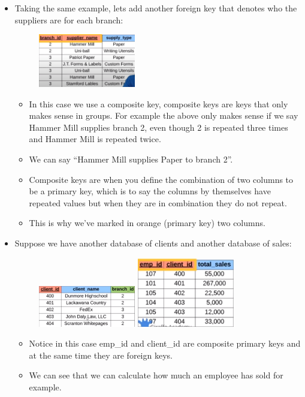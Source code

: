 \begin{itemize}
    \item Taking the same example, lets add another foreign key that denotes who the suppliers are for each branch:
        \begin{figure}[H]
            \centering
            \includegraphics[width=0.4\textwidth]{./figs/example6.png}
        \end{figure}
        \begin{itemize}
            \item In this case we use a composite key, composite keys are keys that only makes sense in groups. For example the above only makes sense if we say Hammer Mill supplies branch 2, even though 2 is repeated three times and Hammer Mill is repeated twice.
            \item We can say ``Hammer Mill supplies Paper to branch 2''.
            \item Composite keys are when you define the combination of two columns to be a primary key, which is to say the columns by themselves have repeated values but when they are in combination they do not repeat.
            \item This is why we've marked in orange (primary key) two columns.
        \end{itemize}
    
    \item Suppose we have another database of clients and another database of sales:
        \begin{figure}[H]
            \centering
            \includegraphics[width=0.4\textwidth]{./figs/example7.png}
            \includegraphics[width=0.4\textwidth]{./figs/example8.png}
        \end{figure}
        \begin{itemize}
            \item Notice in this case emp\_id and client\_id are composite primary keys and at the same time they are foreign keys.
            \item We can see that we can calculate how much an employee has sold for example.
        \end{itemize}
    

\end{itemize}
